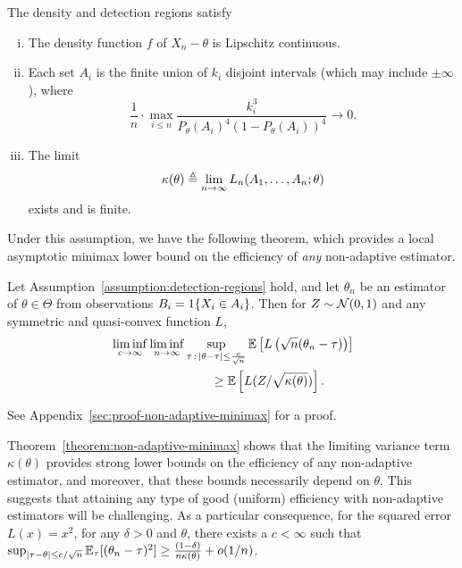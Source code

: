 \begin{assumption}
  \label{assumption:detection-regions}
  The density and detection regions satisfy
  \begin{enumerate}[(i)]
  \item \label{item:lipschitz-density}
    The density function $f$ of $X_n - \theta$ is Lipschitz continuous.
  \item \label{item:finite-intervals}
    Each set $A_i$ is the finite union of $k_i$ disjoint intervals
    (which may include $\pm \infty$), where
    \begin{equation*}
      \frac{1}{n} \cdot \max_{i \le n} \frac{k_i^3}{P_\theta(A_i)^4
        (1 - P_\theta(A_i))^4} \to 0.
    \end{equation*}
  \item \label{item:limit-variance}
    The limit
    \begin{equation}
      \label{eqn:LAN-limit}
      \kappa(\theta) \triangleq \lim_{n\to \infty} L_n(A_1,\ldots,A_n; \theta)
    \end{equation}
    exists and is finite.
  \end{enumerate}
\end{assumption}

Under this assumption, we have the following theorem, which provides
a local asymptotic minimax lower bound on the efficiency of
\emph{any} non-adaptive estimator.
\begin{theorem}
  \label{theorem:non-adaptive-minimax}
  Let Assumption~\ref{assumption:detection-regions} hold, and
  let ${\theta}_n$ be an estimator of $\theta \in \Theta$ from
  observations $B_i = 1\!\left\{X_i \in A_i\right\}$.
  Then for $Z \sim \mathcal{N}(0, 1)$ and any
  symmetric and quasi-convex function $L$,
  \begin{align*}
    & \liminf_{c \to \infty} \liminf_{n \to \infty}
    \sup_{\tau\,:\,|\theta-\tau| \leq \frac{c}{\sqrt{n} }}
    \mathbb{E} \left[ L\left( \sqrt{n}({\theta}_{n} - \tau) \right) \right] \\
    & \qquad \qquad \qquad \qquad \geq
    \mathbb{E}\left[ L (Z/\sqrt{\kappa(\theta)}) \right].
  \end{align*}
\end{theorem}
\noindent
See Appendix~\ref{sec:proof-non-adaptive-minimax} for a proof.

Theorem~\ref{theorem:non-adaptive-minimax} shows that the limiting variance
term $\kappa(\theta)$ provides strong lower bounds on the efficiency of any
non-adaptive estimator, and moreover, that these bounds necessarily depend
on $\theta$. This suggests that attaining any type of good (uniform)
efficiency with non-adaptive estimators will be challenging.  As a
particular consequence, for the squared error $L(x) = x^2$, for any $\delta
> 0$ and $\theta$, there exists a $c < \infty$ such that $\sup_{|\tau -
  \theta| \le c / \sqrt{n}} \mathbb{E}_\tau[(\theta_n - \tau)^2] \ge \frac{(1 -
  \delta)}{n \kappa(\theta)} + o(1/n)$.

